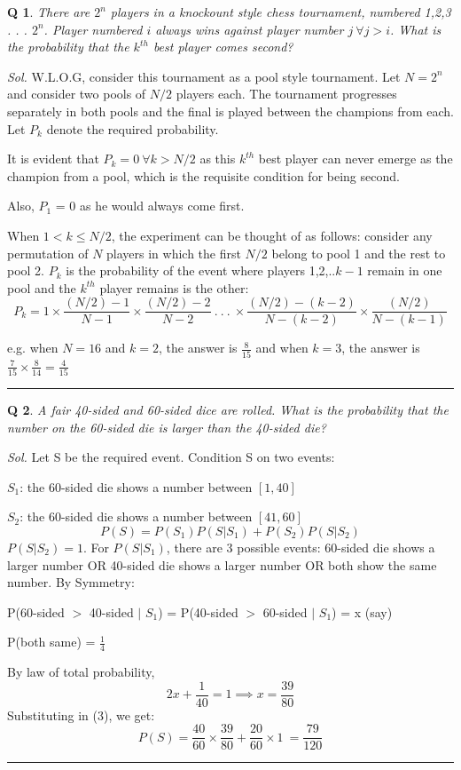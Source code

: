 \documentclass[DIV=15, fleqn, oneside, 8pt]{scrartcl}
\theoremstyle{clean}
\newtheorem{question}{Q} %
\newenvironment{solution}
{\par\textit{Sol.} }     %
{\par\medskip\hrule\bigskip}
\begin{document}
\begin{question}
There are $2^n$ players in a knockount style chess tournament, numbered 1,2,3 . . . $2^n$. 
Player numbered $i$ always wins against player number $j\:\forall j > i$.
What is the probability that the $k^{th}$ best player comes second?
\end{question}
\begin{solution}
W.L.O.G, consider this tournament as a pool style tournament. Let $N = 2^n$ and consider two
pools of $N/2$ players each. The tournament progresses separately in both pools and the final is 
played between the champions from each. Let $P_k$ denote the required probability.

It is evident that $P_k = 0 \: \forall k > N/2$ as this $k^{th}$ best player can never emerge as the
champion from a pool, which is the requisite condition for being second.

Also, $P_1$ = 0 as he would always come first.

When $1 < k \leq N/2$, the experiment can be thought of as follows: consider any permutation of $N$ 
players in which the first $N/2$ belong to pool 1 and the rest to pool 2. $P_k$ is the probability 
of the event where players 1,2,..$k-1$ remain in one pool and the $k^{th}$ player remains is the other:
\[
P_k = 1 \times \frac{(N/2) - 1}{N - 1} \times \frac{(N/2) - 2}{N - 2}\:.\:.\:.\:\times
\frac{(N/2) - (k - 2)}{N - (k - 2)} \times \frac{(N/2)}{N - (k-1)}
\]

e.g. when $N = 16$ and $k = 2$, the answer is $\frac{8}{15}$ and when $k=3$, the answer
is $\frac{7}{15} \times \frac{8}{14} = \frac{4}{15}$
\end{solution}

\begin{question}
A fair 40-sided and 60-sided dice are rolled. What is the probability that the number on the 60-sided
die is larger than the 40-sided die?
\end{question}
\begin{solution}
Let S be the required event. Condition S on two events:

$S_1$: the 60-sided die shows a number between $[1, 40]$

$S_2$: the 60-sided die shows a number between $[41, 60]$
\begin{equation}
P(S) = P(S_1)P(S | S_1) + P(S_2)P(S | S_2)
\end{equation}
$P(S | S_2) = 1$. For $P(S | S_1)$, there are 3 possible events:  60-sided die shows a larger
number OR 40-sided die shows a larger number OR both show the same number. By Symmetry:

P(60-sided $>$ 40-sided $|$ $S_1$) = P(40-sided $>$ 60-sided $|$ $S_1$) = x (say)

P(both same) = $\frac{1}{4}$

By law of total probability,
\[2x + \frac{1}{40} = 1 \implies x = \frac{39}{80}\]
Substituting in (3), we get:
\[P(S) = \frac{40}{60} \times \frac{39}{80} + \frac{20}{60} \times 1\ = \frac{79}{120}\]
\end{solution}
\newpage
\end{document}
